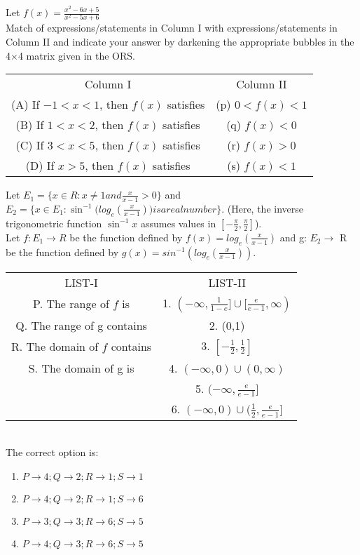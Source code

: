 \item Let $f(x)=\frac{x^2-6x+5}{x^2-5x+6}$\\
Match of expressions/statements in Column I with expressions/statements in Column II and indicate your answer by darkening the appropriate bubbles in the 4$\times$4 matrix given in the ORS.
\begin{table}[h!]
\centering
\begin{tabular}{c c} 
 Column I & Column II\\ [0.5ex] 
 (A) If $-1 < x < 1$, then $f(x)$ satisfies & (p) $0 < f(x) < 1$\\ 
 (B) If $1 < x < 2$, then $f(x)$ satisfies & (q) $f(x) < 0$\\
 (C) If $3 < x < 5$, then $f(x)$ satisfies   & (r) $f(x) > 0$\\
 (D) If $x > 5$, then $f(x)$ satisfies  & (s) $f(x) < 1$\\[1ex] 
\end{tabular}
\end{table}
 

\item Let $E_1 = \{ x \in R: x \neq 1 and \frac{x}{x-1} > 0\}$ and $E_2 = \{ x \in E_1:\sin^{-1}\Big(log_e(\frac{x}{x-1})\Big) is a real number\}$. (Here, the inverse trigonometric function $\sin^{-1}x$ assumes values in $[-\frac{\pi}{2},\frac{\pi}{2}]$).\\
Let $f: E_1 \rightarrow R$ be the function defined by $f(x)=log_e(\frac{x}{x-1})$ and g: $E_2 \rightarrow$ R be the function defined by $g(x)=sin^{-1}(log_e(\frac{x}{x-1}))$.
\begin{table}[h!]
\centering
\begin{tabular}{c c} 
 LIST-I & LIST-II\\ [0.5ex] 
  P. The range of $f$ is &         1. $(-\infty,\frac{1}{1-e}]\cup[\frac{e}{e-1},\infty)$\\ 
  Q. The range of g contains &     2. (0,1)\\
  R. The domain of $f$ contains &  3. $[-\frac{1}{2},\frac{1}{2}]$\\
  S. The domain of g is &          4. $(-\infty,0)\cup(0,\infty)$\\
                                 & 5. $(-\infty,\frac{e}{e-1}]$\\
                                 & 6. $(-\infty,0)\cup(\frac{1}{2},\frac{e}{e-1}]$\\[1ex] 
\end{tabular}
\end{table}\\
The correct option is:
\begin{enumerate}
\item $P \rightarrow 4; Q \rightarrow 2; R \rightarrow 1; S \rightarrow 1$
\item $P \rightarrow 4; Q \rightarrow 2; R \rightarrow 1; S \rightarrow 6$ 
\item $P \rightarrow 3; Q \rightarrow 3; R \rightarrow 6; S \rightarrow 5$
\item $P \rightarrow 4; Q \rightarrow 3; R \rightarrow 6; S \rightarrow 5$
\end{enumerate} 

 

